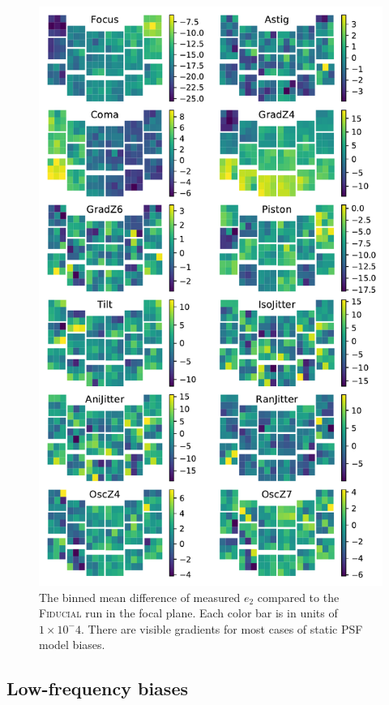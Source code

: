 \documentclass[aps,prd, amsmath,amssymb,superscriptaddress,showkeys,nofootinbib,reprint,preprintnumbers]{revtex4-1}
\begin{document}
\begin{figure}
\begin{center}
\includegraphics[width=\columnwidth]{figures/focal_mean_e2.pdf}
\end{center}
\caption[]{
The binned mean difference of measured $e_2$ compared to the \textsc{Fiducial} run in the focal plane.  Each color bar is in units of $1\times 10^-4$. There are visible gradients for most cases of static PSF model biases.
\label{fig:focal_mean_e2}}
\end{figure}

\subsection{Low-frequency biases}\label{sec:high}
\end{document}
